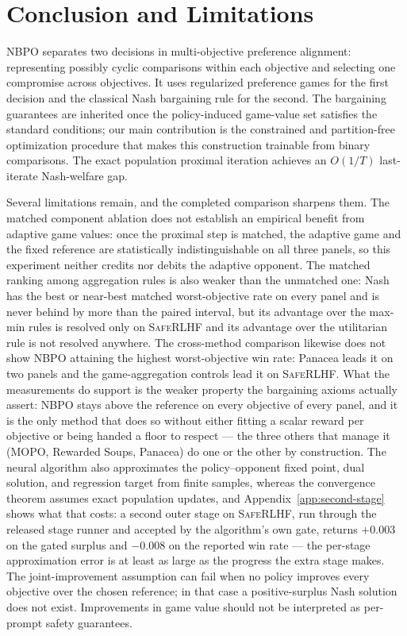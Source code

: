 \documentclass{article}
\theoremstyle{remark}
\theoremstyle{plain}
\newcommand{\NBPO}{\textsc{NBPO}}
\begin{document}
\section{Conclusion and Limitations}
\label{sec:conclusion}
\NBPO{} separates two decisions in multi-objective preference alignment: representing possibly cyclic comparisons within each objective and selecting one compromise across objectives. It uses regularized preference games for the first decision and the classical Nash bargaining rule for the second. The bargaining guarantees are inherited once the policy-induced game-value set satisfies the standard conditions; our main contribution is the constrained and partition-free optimization procedure that makes this construction trainable from binary comparisons. The exact population proximal iteration achieves an $O(1/T)$ last-iterate Nash-welfare gap.

Several limitations remain, and the completed comparison sharpens them. The matched component
ablation does not establish an empirical benefit from adaptive game values: once the proximal step
is matched, the adaptive game and the fixed reference are statistically indistinguishable on all
three panels, so this experiment neither credits nor debits the adaptive opponent. The matched
ranking among aggregation rules is also weaker than the unmatched one: Nash has the best or
near-best matched worst-objective rate on every panel and is never behind by more than the paired
interval, but its advantage over the max-min rules is resolved only on \textsc{SafeRLHF} and its
advantage over the utilitarian rule is not resolved anywhere. The cross-method comparison likewise
does not show \NBPO{} attaining the highest worst-objective win rate: Panacea leads it on two
panels and the game-aggregation controls lead it on \textsc{SafeRLHF}. What the measurements do
support is the weaker property the bargaining axioms actually assert: \NBPO{} stays above the
reference on every objective of every panel, and it is the only method that does so without either
fitting a scalar reward per objective or being handed a floor to respect --- the three others that
manage it (MOPO, Rewarded Soups, Panacea) do one or the other by construction. The neural algorithm
also approximates the policy--opponent fixed point, dual solution, and regression target from
finite samples, whereas the convergence theorem assumes exact population updates, and
Appendix~\ref{app:second-stage} shows what that costs: a second outer stage on \textsc{SafeRLHF},
run through the released stage runner and accepted by the algorithm's own gate, returns $+0.003$ on
the gated surplus and $-0.008$ on the reported win rate --- the per-stage approximation error is at
least as large as the progress the extra stage makes. The
joint-improvement assumption can fail when no policy improves every objective over the chosen
reference; in that case a positive-surplus Nash solution does not exist. Improvements in game value
should not be interpreted as per-prompt safety guarantees.
\end{document}
